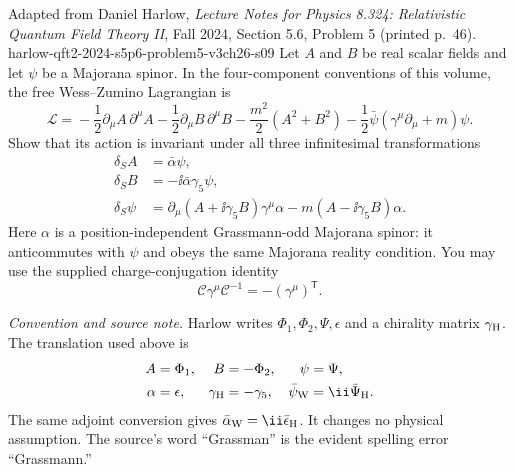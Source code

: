 \begin{enumerate}
    {Adapted from Daniel Harlow, \emph{Lecture Notes for Physics 8.324:
    Relativistic Quantum Field Theory II}, Fall 2024, Section 5.6,
    Problem 5 (printed p.~46).}
    {harlow-qft2-2024-s5p6-problem5-v3ch26-s09}
  Let \(A\) and \(B\) be real scalar fields and let \(\psi\) be a Majorana
  spinor.  In the four-component conventions of this volume, the free
  Wess--Zumino Lagrangian is
  \[
    \mathcal L={}
      -\frac12\partial_\mu A\,\partial^\mu A
      -\frac12\partial_\mu B\,\partial^\mu B
      -\frac{m^2}{2}(A^2+B^2)
      -\frac12\bar\psi(\gamma^\mu\partial_\mu+m)\psi .
  \]
  Show that its action is invariant under all three infinitesimal
  transformations
  \[
    \begin{aligned}
      \delta_S A&=\bar\alpha\psi,\\
      \delta_S B&=-\ii\bar\alpha\gamma_5\psi,\\
      \delta_S\psi
        &=\partial_\mu(A+\ii\gamma_5B)\gamma^\mu\alpha
          -m(A-\ii\gamma_5B)\alpha .
    \end{aligned}
  \]
  Here \(\alpha\) is a position-independent Grassmann-odd Majorana spinor:
  it anticommutes with \(\psi\) and obeys the same Majorana reality
  condition.  You may use the supplied charge-conjugation identity
  \[
    \mathcal C\gamma^\mu\mathcal C^{-1}
      =-(\gamma^\mu)^{\mathsf T}.
  \]

  \emph{Convention and source note.}
  Harlow writes \(\Phi_1,\Phi_2,\Psi,\epsilon\) and a chirality matrix
  \(\gamma_{\rm H}\).  The translation used above is
  \[
    \begin{aligned}
      A&=\Phi_1,& B&=-\Phi_2,& \psi&=\Psi,\\
      \alpha&=\epsilon,& \gamma_{\rm H}&=-\gamma_5,&
      \bar\psi_{\rm W}&=\ii\bar\Psi_{\rm H}.
    \end{aligned}
  \]
  The same adjoint conversion gives
  \(\bar\alpha_{\rm W}=\ii\bar\epsilon_{\rm H}\).  It changes no physical
  assumption.  The source's word ``Grassman'' is the evident spelling error
  ``Grassmann.''


\end{enumerate}

